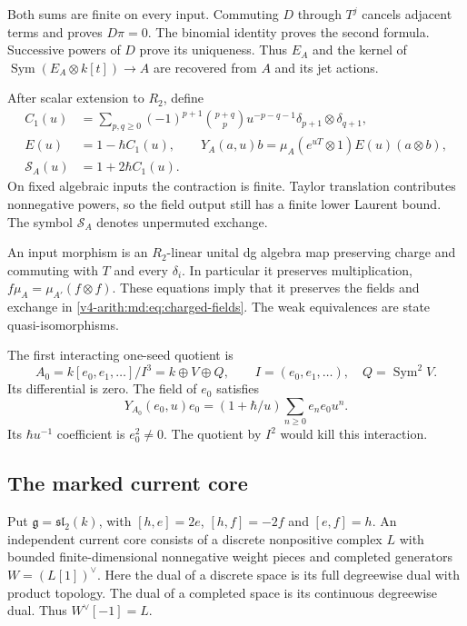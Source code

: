 Both sums are finite on every input. Commuting $D$ through
$T^j$ cancels adjacent terms and proves $D\pi=0$.
The binomial identity proves the second formula. Successive
powers of $D$ prove its uniqueness. Thus $E_A$ and the
kernel of $\operatorname{Sym}(E_A\otimes k[t])\to A$ are
recovered from $A$ and its jet actions.

After scalar extension to $R_2$, define
\begin{equation}\label{v4-arith:md:eq:charged-fields}
 \begin{aligned}
 C_1(u)&=\sum_{p,q\geq0}(-1)^{p+1}\binom{p+q}{p}
 u^{-p-q-1}\delta_{p+1}\otimes\delta_{q+1},\\
 E(u)&=1-\hbar C_1(u),\qquad
 Y_A(a,u)b=\mu_A(e^{uT}\otimes1)E(u)(a\otimes b),\\
 \mathcal S_A(u)&=1+2\hbar C_1(u).
 \end{aligned}
\end{equation}
On fixed algebraic inputs the contraction is finite.
Taylor translation contributes nonnegative powers, so the
field output still has a finite lower Laurent bound.
The symbol $\mathcal S_A$ denotes unpermuted exchange.

An input morphism is an $R_2$-linear unital dg algebra
map preserving charge and commuting with $T$ and every
$\delta_i$. In particular it preserves multiplication,
$f\mu_A=\mu_{A'}(f\otimes f)$.
These equations imply that it preserves the fields and
exchange in \eqref{v4-arith:md:eq:charged-fields}.
The weak equivalences are state quasi-isomorphisms.

The first interacting one-seed quotient is
\begin{equation}\label{v4-arith:md:eq:cubic}
 A_0=k[e_0,e_1,\ldots]/I^3=k\oplus V\oplus Q,
 \qquad I=(e_0,e_1,\ldots),\quad Q=\operatorname{Sym}^2V.
\end{equation}
Its differential is zero. The field of $e_0$ satisfies
\[
 Y_{A_0}(e_0,u)e_0=(1+\hbar/u)\sum_{n\geq0}e_ne_0u^n.
\]
Its $\hbar u^{-1}$ coefficient is $e_0^2\ne0$.
The quotient by $I^2$ would kill this interaction.

\subsection{The marked current core}

Put $\mathfrak g=\mathfrak{sl}_2(k)$, with
$[h,e]=2e$, $[h,f]=-2f$ and $[e,f]=h$.
An independent current core consists of a discrete
nonpositive complex $L$ with bounded finite-dimensional
nonnegative weight pieces and completed generators
$W=(L[1])^\vee$. Here the dual of a discrete space is its
full degreewise dual with product topology. The dual of
a completed space is its continuous degreewise dual.
Thus $W^\vee[-1]=L$.

